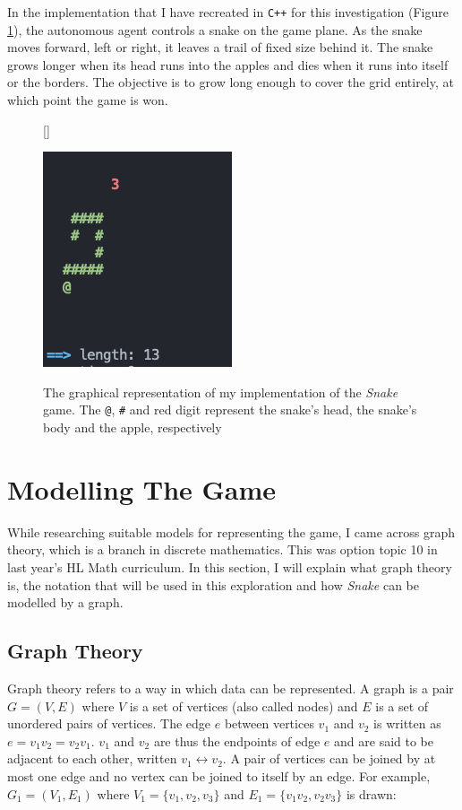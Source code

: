 \documentclass[12pt]{article}
\begin{document}
In the implementation that I have recreated in \texttt{C++} for this investigation (Figure \ref{fig:game_mechanics}), the autonomous agent controls a snake on the game plane. As the snake moves forward, left or right, it leaves a trail of fixed size behind it. The snake grows longer when its head runs into the apples and dies when it runs into itself or the borders. The objective is to grow long enough to cover the grid entirely, at which point the game is won.

\begin{figure}[!h]
\centering
{}[\FBwidth]
	{\caption{The graphical representation of my implementation of the \textit{Snake} game. The \texttt{\makeatletter @\makeatother}, \texttt{\#} and red digit represent the snake's head, the snake's body and the apple, respectively} \label{fig:game_mechanics}
}
	{\includegraphics[scale=0.6]{game_mechanics.png}}
\end{figure}

\section{Modelling The Game}

While researching suitable models for representing the game, I came across graph theory, which is a branch in discrete mathematics. This was option topic 10 in last year's HL Math curriculum. In this section, I will explain what graph theory is, the notation that will be used in this exploration and how \textit{Snake} can be modelled by a graph.

\subsection{Graph Theory}

Graph theory refers to a way in which data can be represented. A  graph is a pair $G=(V,E)$ where $V$ is a set of vertices (also called nodes) and $E$ is a set of unordered pairs of vertices. The edge $e$ between vertices $v_{1}$ and $v_{2}$ is written as $e=v_{1}v_{2}=v_{2}v_{1}$. $v_{1}$ and $v_{2}$ are thus the endpoints of edge $e$ and are said to be adjacent to each other, written $v_{1} \leftrightarrow v_{2}$. A pair of vertices can be joined by at most one edge and no vertex can be joined to itself by an edge. For example, $G_{1}=(V_{1},E_{1})$ where $V_{1}=\{v_{1}, v_{2}, v_{3}\}$ and $E_{1}=\{v_{1}v_{2}, v_{2}v_{3}\}$ is drawn:
\end{document}
